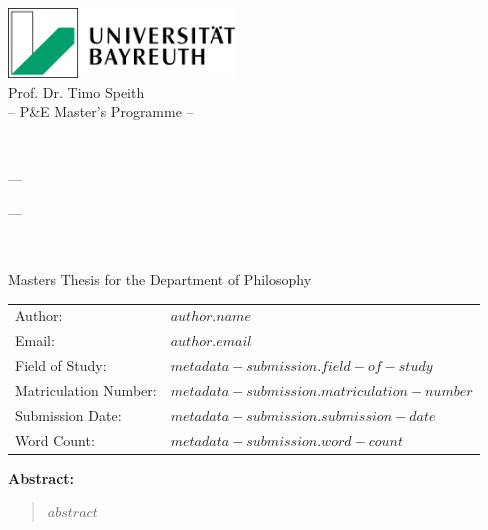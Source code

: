\begin{titlepage}
  \begin{center}
    \includegraphics[width=6cm]{latex/uni-bayreuth-logo.png}\\[1cm]
    {\Large Prof. Dr. Timo Speith}\\[0.5cm]
    {\large -- P\&E Master's Programme --}\\[2cm]
  \end{center}

  \begin{center}
    \LARGE\textbf{\thetitle}\\[1cm]
    {\large --- \\[0.5cm] \subtitle \\[0.5cm] ---}\\[2cm]
  \end{center}
  
  \begin{center}
    \large Masters Thesis for the Department of Philosophy
  \end{center}
  
  \begin{center}
    \begin{tabular}{ll}
      \toprule
      Author: & $author.name$ \\
      Email: & $author.email$ \\
      Field of Study: & $metadata-submission.field-of-study$ \\
      Matriculation Number: & $metadata-submission.matriculation-number$ \\
      Submission Date: & $metadata-submission.submission-date$ \\
      Word Count: & $metadata-submission.word-count$ \\
      \bottomrule
    \end{tabular}
  \end{center}
  
  \begin{center}
    \large\textbf{Abstract:}
  \end{center}
  
  \begin{quotation}
    $abstract$
  \end{quotation}
\end{titlepage}